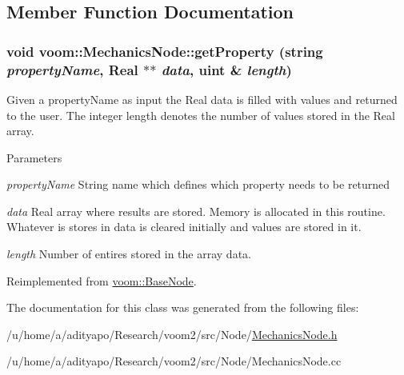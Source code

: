 \subsection{Member Function Documentation}
\hypertarget{classvoom_1_1_mechanics_node_a921fd1f238a85727c87f1f2833d222ab}{
\subsubsection[{getProperty}]{\setlength{\rightskip}{0pt plus 5cm}void voom::MechanicsNode::getProperty (string {\em propertyName}, \/  Real $\ast$$\ast$ {\em data}, \/  uint \& {\em length})}}
\label{classvoom_1_1_mechanics_node_a921fd1f238a85727c87f1f2833d222ab}
Given a propertyName as input the Real data is filled with values and returned to the user. The integer length denotes the number of values stored in the Real array. 
\begin{DoxyParams}{Parameters}
\item[{\em propertyName}]String name which defines which property needs to be returned \item[{\em data}]Real array where results are stored. Memory is allocated in this routine. Whatever is stores in data is cleared initially and values are stored in it. \item[{\em length}]Number of entires stored in the array data. \end{DoxyParams}


Reimplemented from \hyperlink{classvoom_1_1_base_node_a4d42efec19c4e3f4770828688daa65c5}{voom::BaseNode}.

The documentation for this class was generated from the following files:\begin{DoxyCompactItemize}
\item 
/u/home/a/adityapo/Research/voom2/src/Node/\hyperlink{_mechanics_node_8h}{MechanicsNode.h}\item 
/u/home/a/adityapo/Research/voom2/src/Node/MechanicsNode.cc\end{DoxyCompactItemize}
